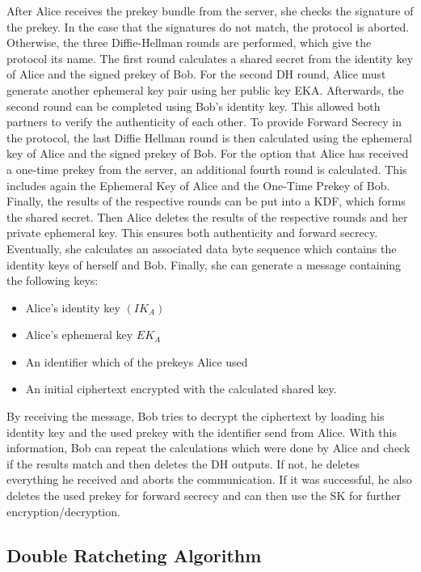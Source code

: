 \documentclass[12pt,oneside,a4paper,parskip]{scrbook}
\begin{document}
After Alice receives the prekey bundle from the server, she checks the signature of the prekey. In the case that the signatures do not match, the protocol is aborted.
Otherwise, the three Diffie-Hellman rounds are performed, which give the protocol its name. The first round calculates a shared secret from the identity key of Alice and the signed prekey of Bob. For the second DH round, Alice must generate another ephemeral key pair using her public key EKA. Afterwards, the second round can be completed using Bob's identity key. This allowed both partners to verify the authenticity of each other. To provide Forward Secrecy in the protocol, the last Diffie Hellman round is then calculated using the ephemeral key of Alice and the signed prekey of Bob. 
For the option that Alice has received a one-time prekey from the server, an additional fourth round is calculated. This includes again the Ephemeral Key of Alice and the One-Time Prekey of Bob.
Finally, the results of the respective rounds can be put into a KDF, which forms the shared secret. Then Alice deletes the results of the respective rounds and her private ephemeral key. This ensures both authenticity and forward secrecy. Eventually, she calculates an associated data byte sequence which contains the identity keys of herself and Bob.
Finally, she can generate a message containing the following keys:
\begin{itemize}
  \item Alice's identity key $    (IK_{A})  $
  \item Alice's ephemeral key $   {EK_{A}}  $
  \item An identifier which of the prekeys Alice used
  \item An initial ciphertext encrypted with the calculated shared key.
\end{itemize}

By receiving the message, Bob tries to decrypt the ciphertext by loading his identity key and the used prekey with the identifier send from Alice. With this information, Bob can repeat the calculations which were done by Alice and check if the results match and then deletes the DH outputs. If not, he deletes everything he received and aborts the communication. If it was successful, he also deletes the used prekey for forward secrecy and can then use the SK for further encryption/decryption. 
\parencite{marlinspike_x3dh_2016}

\subsection{Double Ratcheting Algorithm}
\label{subsec:double_ratchet}
\end{document}

